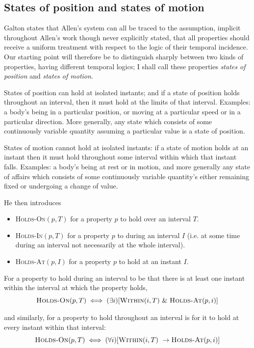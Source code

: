 \subsection{States of position and states of motion}
Galton states that Allen's system can all be traced to the assumption, implicit throughout Allen's
work though never explicitly stated, that all properties should receive a
uniform treatment with respect to the logic of their temporal incidence. Our
starting point will therefore be to distinguish sharply between two kinds of
properties, having different temporal logics; I shall call these properties \textit{states
	of position} and \textit{states of motion}.

States of position can hold at isolated instants; and if a state of position
holds throughout an interval, then it must hold at the limits of that interval.
Examples: a body's being in a particular position, or moving at a particular
speed or in a particular direction. More generally, any state which consists of
some continuously variable quantity assuming a particular value is a state of
position.

States of motion cannot hold at isolated instants: if a state of motion holds
at an instant then it must hold throughout some interval within which that
instant falls. Examples: a body's being at rest or in motion, and more generally
any state of affairs which consists of some continuously variable quantity's
either remaining fixed or undergoing a change of value.

He then introduces
\begin{itemize}
	\item  \textsc{Holds-On}$(p, T)$ for a property $p$ to hold over an interval $T$.
	\item \textsc{Holds-In}$(p, T)$ for a property $p$ to during an interval $I$ (i.e. at some time during an interval not necessarily at the whole interval).
	\item \textsc{Holds-At}$(p, I)$ for a property $p$ to hold at an instant $I$.
\end{itemize}

For a property to hold during
an interval to be that there is at least one instant within the interval at which
the property holds,
\[
	\textsc{Holds-On}(p, T) \iff (\exists i)[\textsc{Within}(i, T) \  \& \ \textsc{Holds-At}(p, i)]
\]

and similarly, for a property to hold throughout an interval is for it to hold at
every instant within that interval:
\[
	\textsc{Holds-On}(p, T) \iff (\forall i)[\textsc{Within}(i, T) \  \to \textsc{Holds-At}(p, i)]
\]


